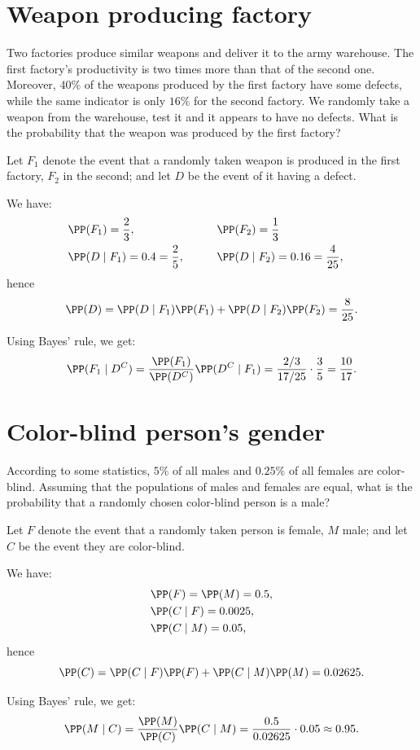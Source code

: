 \section{Weapon producing factory}
\begin{problem} %
Two factories produce similar weapons and deliver it to the army warehouse. The first factory’s productivity is two times more than that of
the second one. Moreover, $40\%$ of the weapons produced by the first
factory have some defects, while the same indicator is only $16\%$ for
the second factory. We randomly take a weapon from the warehouse,
test it and it appears to have no defects. What is the probability that
the weapon was produced by the first factory?
\end{problem}
\bigskip

\begin{solution} %
Let $F_1$ denote the event that a randomly taken weapon is produced in the first factory, $F_2$ in the second; and let $D$ be the event of it having a defect.

We have:
\begin{align*}
    &\PP(F_1) = \dfrac{2}{3},&\qquad &\PP(F_2) = \dfrac{1}{3}&\\
    &\PP(D\mid F_1) = 0.4= \dfrac{2}{5},&\qquad &\PP(D\mid F_2) = 0.16= \dfrac{4}{25},
\end{align*}
hence 
\[\PP(D) = \PP(D\mid F_1)\PP(F_1)+\PP(D\mid F_2)\PP(F_2)=\dfrac{8}{25}.\]

Using Bayes' rule, we get:
\begin{align*}
     \PP(F_1 \mid D^C) = \dfrac{\PP(F_1)}{\PP(D^C)}
     \PP(D^C \mid F_1)=\dfrac{2/3}{17/25}\cdot \dfrac{3}{5}=\dfrac{10}{17}.
\end{align*}
\end{solution}


\section{Color-blind person's gender}
\begin{problem} %
According to some statistics, $5\%$ of all males and $0.25\%$ of all females
are color-blind. Assuming that the populations of males and females
are equal, what is the probability that a randomly chosen color-blind person is a male?
\end{problem}
\bigskip
\begin{solution} %
Let $F$ denote the event that a randomly taken person is female, $M$ male; and let $C$ be the event they are color-blind.

We have:
\begin{align*}
    &\PP(F)=\PP(M) = 0.5,\\
    &\PP(C\mid F) = 0.0025,\\
    &\PP(C\mid M) = 0.05,
\end{align*}
hence 
\[\PP(C) = \PP(C\mid F)\PP(F)+\PP(C\mid M)\PP(M)=0.02625.\]

Using Bayes' rule, we get:
\begin{align*}
     \PP(M \mid C) = \dfrac{\PP(M)}{\PP(C)}
     \PP(C \mid M)=\dfrac{0.5}{0.02625}\cdot0.05\approx 0.95.
\end{align*}
\end{solution}
  

